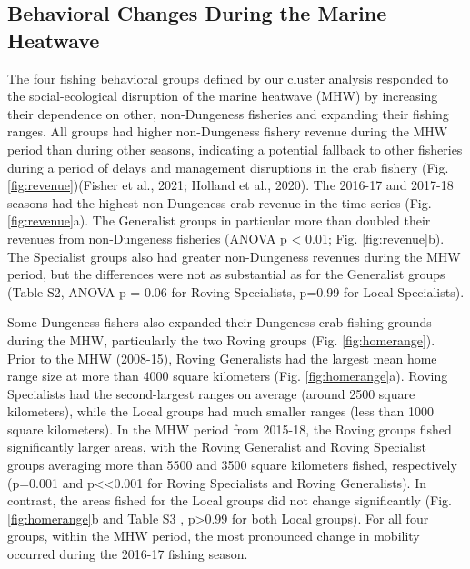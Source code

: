 \documentclass[]{elsarticle} %
\begin{document}
\hypertarget{behavioral-changes-during-the-marine-heatwave}{%
\subsection{Behavioral Changes During the Marine
Heatwave}\label{behavioral-changes-during-the-marine-heatwave}}

The four fishing behavioral groups defined by our cluster analysis
responded to the social-ecological disruption of the marine heatwave
(MHW) by increasing their dependence on other, non-Dungeness fisheries
and expanding their fishing ranges. All groups had higher non-Dungeness
fishery revenue during the MHW period than during other seasons,
indicating a potential fallback to other fisheries during a period of
delays and management disruptions in the crab fishery (Fig.
\ref{fig:revenue})(Fisher et al., 2021; Holland et al., 2020). The
2016-17 and 2017-18 seasons had the highest non-Dungeness crab revenue
in the time series (Fig. \ref{fig:revenue}a). The Generalist groups in
particular more than doubled their revenues from non-Dungeness fisheries
(ANOVA p \textless{} 0.01; Fig. \ref{fig:revenue}b). The Specialist
groups also had greater non-Dungeness revenues during the MHW period,
but the differences were not as substantial as for the Generalist groups
(Table S2, ANOVA p = 0.06 for Roving Specialists, p=0.99 for Local
Specialists).

Some Dungeness fishers also expanded their Dungeness crab fishing
grounds during the MHW, particularly the two Roving groups (Fig.
\ref{fig:homerange}). Prior to the MHW (2008-15), Roving Generalists had
the largest mean home range size at more than 4000 square kilometers
(Fig. \ref{fig:homerange}a). Roving Specialists had the second-largest
ranges on average (around 2500 square kilometers), while the Local
groups had much smaller ranges (less than 1000 square kilometers). In
the MHW period from 2015-18, the Roving groups fished significantly
larger areas, with the Roving Generalist and Roving Specialist groups
averaging more than 5500 and 3500 square kilometers fished, respectively
(p=0.001 and p\textless\textless0.001 for Roving Specialists and Roving
Generalists). In contrast, the areas fished for the Local groups did not
change significantly (Fig. \ref{fig:homerange}b and Table S3 ,
p\textgreater0.99 for both Local groups). For all four groups, within
the MHW period, the most pronounced change in mobility occurred during
the 2016-17 fishing season.
\end{document}
